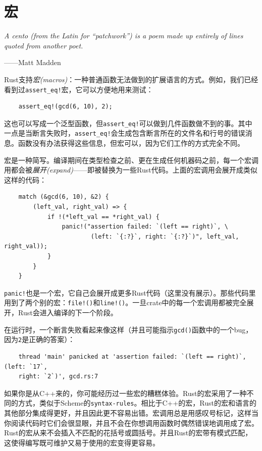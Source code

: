 \chapter{宏}\label{ch21}

\emph{A cento (from the Latin for “patchwork”) is a poem made up entirely of lines quoted from another poet.}
\begin{flushright}
    ——Matt Madden
\end{flushright}

Rust支持\emph{宏(macros)}：一种普通函数无法做到的扩展语言的方式。例如，我们已经看到过\texttt{assert\_eq!}宏，它可以方便地用来测试：
\begin{verbatim}
    assert_eq!(gcd(6, 10), 2);
\end{verbatim}

这也可以写成一个泛型函数，但\texttt{assert\_eq!}可以做到几件函数做不到的事。其中一点是当断言失败时，\texttt{assert\_eq!}会生成包含断言所在的文件名和行号的错误消息。函数没有办法获得这些信息，但宏可以，因为它们工作的方式完全不同。

宏是一种简写。编译期间在类型检查之前、更在生成任何机器码之前，每一个宏调用都会被\emph{展开(expand)}——即被替换为一些Rust代码。上面的宏调用会展开成类似这样的代码：
\begin{verbatim}
    match (&gcd(6, 10), &2) {
        (left_val, right_val) => {
            if !(*left_val == *right_val) {
                panic!("assertion failed: `(left == right)`, \
                        (left: `{:?}`, right: `{:?}`)", left_val, right_val));
            }
        }
    }
\end{verbatim}

\texttt{panic!}也是一个宏，它自己会展开成更多Rust代码（这里没有展示）。那些代码里用到了两个别的宏：\texttt{file!()}和\texttt{line!()}。一旦crate中的每一个宏调用都被完全展开，Rust会进入编译的下一个阶段。

在运行时，一个断言失败看起来像这样（并且可能指示\texttt{gcd()}函数中的一个bug，因为\texttt{2}是正确的答案）：
\begin{verbatim}
    thread 'main' panicked at 'assertion failed: `(left == right)`, (left: `17`,
    right: `2`)', gcd.rs:7
\end{verbatim}

如果你是从C++来的，你可能经历过一些宏的糟糕体验。Rust的宏采用了一种不同的方式，类似于Scheme的\texttt{syntax-rules}。相比于C++的宏，Rust的宏和语言的其他部分集成得更好，并且因此更不容易出错。宏调用总是用感叹号标记，这样当你阅读代码时它们会很显眼，并且不会在你想调用函数时偶然错误地调用成了宏。Rust的宏从来不会插入不匹配的花括号或圆括号。并且Rust的宏带有模式匹配，这使得编写既可维护又易于使用的宏变得更容易。

